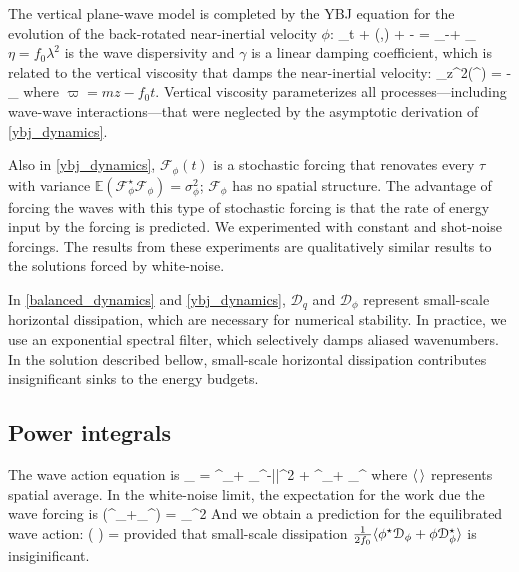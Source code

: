 \documentclass[12pt]{article}
\newcommand{\F}{\mathcal{F}}
\newcommand{\D}{\mathcal{D}}
\newcommand{\phis}{\phi^\star}
\newcommand{\A}{  \mathcal{A}}
\newcommand{\disp}{\eta}
\newcommand{\ze}{\zeta}
\newcommand{\Es}{\mathbb{E}}
\newcommand{\p}{\partial}
\begin{document}
The vertical plane-wave model is completed by the YBJ equation for the evolution
of the back-rotated near-inertial velocity $\phi$:
\beq
\phi_t + \sJ(\psi,\phi) +  \phi {}\ze -  \disp \lap \phi
 = \F_\phi -\gamma \phi + \D_\phi\com
 \label{ybj_dynamics}
\eeq
$\eta = f_0\lambda^2$ is the wave dispersivity and  $\gamma$
is a linear damping coefficient, which is related to the vertical viscosity
that damps the near-inertial velocity:
\beq
\nu \p_z^2(\phi \ee^{\ii \varpi}) = - _{ \gamma}\phi\com
\eeq
where $\varpi = mz - f_0 t$. Vertical viscosity parameterizes
all processes---including wave-wave interactions---that were neglected by the
asymptotic derivation of \eqref{ybj_dynamics}.

Also in \eqref{ybj_dynamics}, $\F_\phi(t)$ is a stochastic forcing that renovates
every $\tau$ with variance $\Es(\F_\phis\F_\phi) = \sigma_\phi^2$; $\F_\phi$ has
no spatial structure. The advantage of forcing the waves with this type of stochastic
forcing is that the rate of energy input by the forcing is predicted. We experimented
with constant and shot-noise forcings. The results from these experiments are
 qualitatively similar results to the solutions forced by white-noise.

In \eqref{balanced_dynamics} and \eqref{ybj_dynamics}, $\D_q$ and $\D_{\phi}$ represent
small-scale horizontal dissipation, which are necessary for numerical stability.
In practice, we use an exponential spectral filter, which selectively damps aliased
wavenumbers. In the solution described bellow, small-scale horizontal dissipation contributes
insignificant sinks to the energy budgets.


\subsection{Power integrals}

The wave action equation is
\beq
{} _{ \A} = \la \phis \xi_\phi +
\phi \xi_\phis \ra -\gamma \la |\phi|^2 \ra +  \la \phis\D_\phi + \phi\D_\phis \ra\com
\label{A}
\eeq
where $\langle\,\rangle$ represents spatial average. In the white-noise limit, the expectation for
the work due the wave forcing is
\beq
\Es\Big(\la \phis \xi_\phi+\phi \xi_\phis \ra\Big) = \half\sigma_\phi^2\per
\eeq
And we obtain a prediction for the equilibrated wave action:
\beq
\label{prediced_A}
\Es(\A) = \com
\eeq
provided that small-scale dissipation $\tfrac{1}{2f_0}\la\phis\D_\phi+\phi\D_\phis\ra$
is insiginificant.
\end{document}
